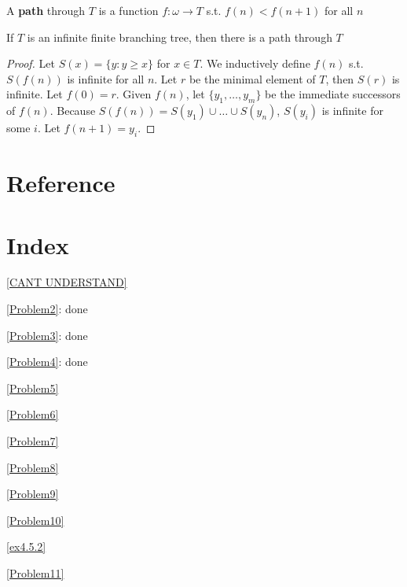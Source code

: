 \documentclass[11pt]{article}
\begin{document}
A \textbf{path} through \(T\) is a function \(f:\omega\to T\) s.t. \(f(n)<f(n+1)\) for all \(n\)

\begin{lemma}
\label{lemmaA.21}
If \(T\) is an infinite finite branching tree, then there is a path through \(T\)
\end{lemma}

\begin{proof}
Let \(S(x)=\{y:y\ge x\}\) for \(x\in T\). We inductively define \(f(n)\) s.t. \(S(f(n))\) is infinite
for all \(n\). Let \(r\) be the minimal element of \(T\), then \(S(r)\) is infinite.
Let \(f(0)=r\). Given \(f(n)\), let \(\{y_1,\dots,y_m\}\) be the immediate successors of \(f(n)\).
Because \(S(f(n))=S(y_1)\cup\dots\cup S(y_n)\), \(S(y_i)\) is infinite for some \(i\). Let \(f(n+1)=y_i\).
\end{proof}
\section{Reference}
\label{sec:org3ff079d}


\section{Index}
\label{sec:org4256cda}
\renewcommand{\indexname}{}
\printindex
\appendix
\ref{CANT UNDERSTAND}


\ref{Problem2}: done


\ref{Problem3}: done


\ref{Problem4}: done


\ref{Problem5}

\ref{Problem6}

\ref{Problem7}

\ref{Problem8}

\ref{Problem9}

\ref{Problem10}

\ref{ex4.5.2}

\ref{Problem11}
\end{document}
